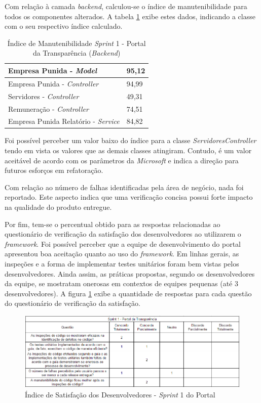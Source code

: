 Com relação à camada \textit{backend}, calculou-se o índice de manutenibilidade para todos os componentes alterados. A tabela \ref{table:tabela4} exibe estes dados, indicando a classe com o seu respectivo índice calculado.

\begin{table}[h]
\caption{Índice de Manutenibilidade \textit{Sprint} 1 - Portal da Transparência (\textit{Backend})}
\centering
\begin{tabular}{ | m{10cm} | m{6cm} | } 
\hline
Empresa Punida - \textit{Model} & 95,12 \\ 
\hline
Empresa Punida - \textit{Controller} & 94,99 \\ 
\hline
Servidores - \textit{Controller} & 49,31 \\ 
\hline
Remuneração - \textit{Controller} & 74,51 \\ 
\hline
Empresa Punida Relatório - \textit{Service} & 84,82 \\
\hline
\end{tabular}
\label{table:tabela4}
\end{table}

Foi possível perceber um valor baixo do índice para a classe \textit{ServidoresController} tendo em vista os valores que as demais classes atingiram. Contudo, é um valor aceitável de acordo com os parâmetros da \textit{Microsoft} e indica a direção para futuros esforços em refatoração.

Com relação ao número de falhas identificadas pela área de negócio, nada foi reportado. Este aspecto indica que uma verificação concisa possui forte impacto na qualidade do produto entregue.

Por fim, tem-se o percentual obtido para as respostas relacionadas ao questionário de verificação da satisfação dos desenvolvedores ao utilizarem o \textit{framework}. Foi possível perceber que a equipe de desenvolvimento do portal apresentou boa aceitação quanto ao uso do \textit{framework}. Em linhas gerais, as inspeções e a forma de implementar testes unitários foram bem vistas pelos desenvolvedores. Ainda assim, as práticas propostas, segundo os desenvolvedores da equipe, se mostratam onerosas em contextos de equipes pequenas (até 3 desenvolvedores). A figura \ref{fig:satisfacaoPortal1} exibe a quantidade de respostas para cada questão do questionário de verificação da satisfação.

\begin{figure}[h]
\includegraphics[width=\textwidth]{figuras/isd_portal_1.png}
\caption{Índice de Satisfação dos Desenvolvedores - \textit{Sprint} 1 do Portal}
\label{fig:satisfacaoPortal1}
\end{figure}

